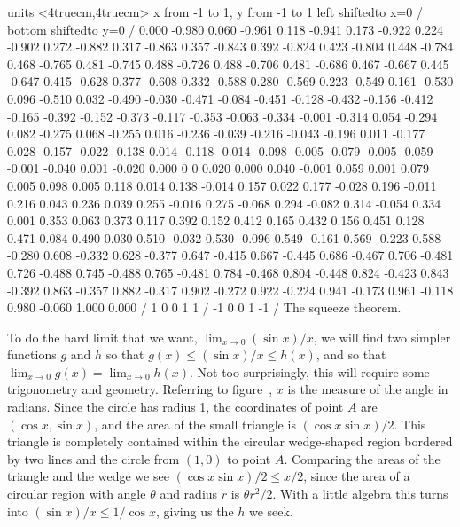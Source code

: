\figure
\texonly
\vbox{\beginpicture
\normalgraphs
\ninepoint
\setcoordinatesystem units <4truecm,4truecm>
\setplotarea x from -1 to 1, y from -1 to 1
\axis left shiftedto x=0 /
\axis bottom shiftedto y=0 /
\setquadratic
{} 0.000 -0.980 0.060 -0.961 0.118 -0.941 0.173 -0.922 0.224
-0.902 0.272 -0.882 0.317 -0.863 0.357 -0.843 0.392 -0.824 0.423
-0.804 0.448 -0.784 0.468 -0.765 0.481 -0.745 0.488 -0.726 0.488
-0.706 0.481 -0.686 0.467 -0.667 0.445 -0.647 0.415 -0.628 0.377
-0.608 0.332 -0.588 0.280 -0.569 0.223 -0.549 0.161 -0.530 0.096
-0.510 0.032 -0.490 -0.030 -0.471 -0.084 -0.451 -0.128 -0.432 -0.156
-0.412 -0.165 -0.392 -0.152 -0.373 -0.117 -0.353 -0.063 -0.334 -0.001
-0.314 0.054 -0.294 0.082 -0.275 0.068 -0.255 0.016 -0.236 -0.039
-0.216 -0.043 -0.196 0.011 -0.177 0.028 -0.157 -0.022 -0.138 0.014
-0.118 -0.014 -0.098 -0.005 -0.079 -0.005 -0.059 -0.001 -0.040 0.001
-0.020 0.000 0 0
0.020 0.000 0.040 -0.001 0.059 0.001 0.079 0.005 0.098 0.005
0.118 0.014 0.138 -0.014 0.157 0.022 0.177 -0.028 0.196 -0.011
0.216 0.043 0.236 0.039 0.255 -0.016 0.275 -0.068 0.294 -0.082
0.314 -0.054 0.334 0.001 0.353 0.063 0.373 0.117 0.392 0.152
0.412 0.165 0.432 0.156 0.451 0.128 0.471 0.084 0.490 0.030
0.510 -0.032 0.530 -0.096 0.549 -0.161 0.569 -0.223 0.588 -0.280
0.608 -0.332 0.628 -0.377 0.647 -0.415 0.667 -0.445 0.686 -0.467
0.706 -0.481 0.726 -0.488 0.745 -0.488 0.765 -0.481 0.784 -0.468
0.804 -0.448 0.824 -0.423 0.843 -0.392 0.863 -0.357 0.882 -0.317
0.902 -0.272 0.922 -0.224 0.941 -0.173 0.961 -0.118 0.980 -0.060
1.000 0.000 /
 1 0 0 1 1 /
 -1 0 0 1 -1 /
\endpicture}
\endtexonly
{}
\begincaption
The squeeze theorem.
\endcaption
\endfigure

To do the hard limit that we want, $\lim_{x\to0}
(\sin x)/x$, we will find two simpler functions $g$ and $h$ so that 
$g(x)\le (\sin x)/x\le h(x)$, and so that
$\lim_{x\to0}g(x)=\lim_{x\to0}h(x)$. Not too surprisingly, this will
require some trigonometry and geometry. Referring to
figure~, $x$ is the measure of the angle in
radians. Since the circle has radius 1, the coordinates of point $A$
are $(\cos x,\sin x)$, and the area of the small triangle is 
$(\cos x\sin x)/2$. This triangle is completely contained within the
circular wedge-shaped region bordered by two lines and the circle from
$(1,0)$ to point $A$. Comparing the areas of the triangle and the
wedge we see
$(\cos x\sin x)/2 \le x/2$, since the area of a circular region with
angle $\theta$ and radius $r$ is $\theta r^2/2$. With a little algebra
this turns into $(\sin x)/x \le 1/\cos x$, giving us the $h$ we seek.

